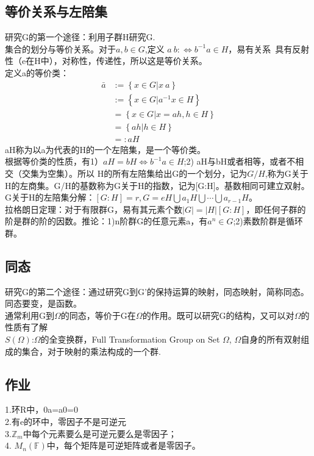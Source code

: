 \subsection{等价关系与左陪集}
研究G的第一个途径：利用子群H研究G.\\
集合的划分与等价关系。对于$a,b \in G$,定义 $a~b:\Leftrightarrow b^{-1}a \in H$，易有关系~具有反射性（e在H中），对称性，传递性，所以这是等价关系。\\
定义a的等价类：
\begin{equation}
\begin{split}
\bar a  & :=\left\{ x \in G |x~a \right\}\\
        &:=\left\{ x \in G | a^{-1}x \in H \right\}\\
        &= \left\{ x\in G | x=ah,h\in H \right\}\\
        & =\left\{ ah |h \in H \right\}\\
        &=:aH
\end{split}
\end{equation}
aH称为以a为代表的H的一个左陪集，是一个等价类。\\
根据等价类的性质，有1）$aH=bH \Leftrightarrow b^{-1}a \in H$;2) aH与bH或者相等，或者不相交（交集为空集）。所以 H的所有左陪集给出G的一个划分，记为$G/H$,称为G关于H的左商集。G/H的基数称为G关于H的指数，记为[G:H]。基数相同可建立双射。\\
G关于H的左陪集分解：$[G:H]=r, G=eH \bigcup a_1H \bigcup \cdots \bigcup a_{r-1}H$。\\
拉格朗日定理：对于有限群G，易有其元素个数$|G|=|H|[G:H]$，即任何子群的阶是群的阶的因数。推论：1)n阶群G的任意元素a，有$a^n \in G$;2)素数阶群是循环群。

\subsection{同态}
研究G的第二个途径：通过研究G到G'的保持运算的映射，同态映射，简称同态。同态要变，是函数。\\
通常利用G到$\Omega$的同态，等价于G在$\Omega$的作用。既可以研究G的结构，又可以对$\Omega$的性质有了解\\
$S(\Omega)$:$\Omega$的全变换群，Full Transformation Group on Set $\Omega$, $\Omega$自身的所有双射组成的集合，对于映射的乘法构成的一个群.\\

\subsection{作业}
1.环R中，0a=a0=0 \\
2.有e的环中，零因子不是可逆元\\
3.$\mathbb Z_m$中每个元素要么是可逆元要么是零因子；\\
4. $M_n(\mathbb F)$中，每个矩阵是可逆矩阵或者是零因子。

